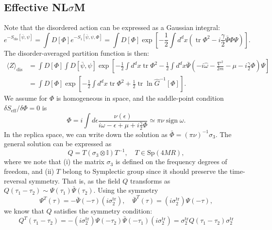 \documentclass[aps,prb,superscriptaddress,nofootinbib]{revtex4}
\def \tr{\operatorname{tr}}
\begin{document}
\subsection{Effective NL$\sigma$M}

Note that the disordered action can be expressed as a Gaussian integral:
\begin{equation}
	e^{-S_{\mathrm{dis}}[\bar\psi,\psi]} 
	= \int D[\Phi] e^{-S_1[\bar\psi,\psi,\Phi]} 
	= \int D[\Phi] \exp\left[-\frac{1}{2} \int d^d x \left(\tr \Phi^2 -i\frac{\gamma}{2}\bar\Psi\Phi\Psi \right)\right].
\end{equation}
The disorder-averaged partition function is then:
\begin{equation}
\begin{aligned}
	\langle Z \rangle_{\mathrm{dis}} &= \int D[\Phi] \int D[\bar\psi,\psi] \exp\left[-\frac{1}{2} \int d^d x \tr \Phi^2 -\frac{1}{2}\int d^d x \bar\Psi\left(-i\hat\omega-\frac{\nabla^2}{2m}-\mu -i\frac{\gamma}{2}\Phi\right)\Psi\right] \\
	&= \int D[\Phi] \exp\left[-\frac{1}{2}\int d^d x \tr \Phi^2 +\frac{1}{2}\tr\ln \hat G^{-1}[\Phi]\right].
\end{aligned}
\end{equation}
We assume for $\Phi$ is homogeneous in space, and the saddle-point condition $\delta S_{\mathrm{eff}}/\delta \Phi =0$ is
\begin{equation}
	\Phi = i \int d\epsilon \frac{\nu(\epsilon)}{i\omega -\epsilon+\mu+i\frac{\gamma}{2}\Phi}
	\simeq \pi\nu\operatorname{sign}\omega.
\end{equation}
In the replica space, we can write down the solution as $\bar \Phi = (\pi\nu)^{-1} \sigma_3$.
The general solution can be expressed as
\begin{equation}
	Q = T(\sigma_3\otimes \mathbb I) T^{-1},\quad T\in \mathrm{Sp}(4MR),
\end{equation}
where we note that (i) the matrix $\sigma_3$ is defined on the frequency degrees of freedom, and (ii) $T$ belong to Symplectic group since it should preserve the time-reversal symmetry.
That is, as the field $Q$ transforms as $Q(\tau_1-\tau_2) \sim \Psi(\tau_1) \bar\Psi(\tau_2)$.
Using the symmetry 
\begin{equation}
	\Psi^T(\tau)=-\bar\Psi(-\tau)(i\sigma_2^\mathrm{tr}),\quad
	\bar\Psi^T(\tau)=(i\sigma_2^\mathrm{tr})\Psi(-\tau),
\end{equation}
we know that $Q$ satisfies the symmetry condition:
\begin{equation}
	Q^T(\tau_1-\tau_2) = -(i\sigma_2^\mathrm{tr})\Psi(-\tau_2)\bar\Psi(-\tau_1)(i\sigma_2^\mathrm{tr})
	=\sigma_2^\mathrm{tr}Q(\tau_1-\tau_2)\sigma_2^\mathrm{tr}
\end{equation}
\end{document}
